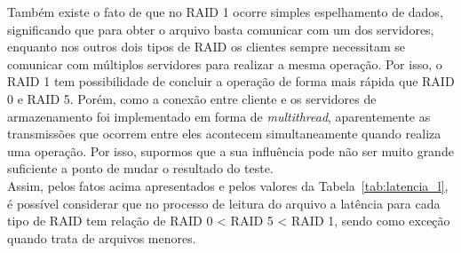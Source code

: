 	Também existe o fato de que no RAID 1 ocorre simples espelhamento de dados, significando que para obter o arquivo basta comunicar com um dos servidores, enquanto nos outros dois tipos de RAID os clientes sempre necessitam se comunicar com múltiplos servidores para realizar a mesma operação. Por isso, o RAID 1 tem possibilidade de concluir a operação de forma mais rápida que RAID 0 e RAID 5. Porém, como a conexão entre cliente e os servidores de armazenamento foi implementado em forma de \textit{multithread}, aparentemente as transmissões que ocorrem entre eles acontecem simultaneamente quando realiza uma operação. Por isso, supormos que a sua influência pode não ser muito grande suficiente a ponto de mudar o resultado do teste.
	\\
	
	Assim, pelos fatos acima apresentados e pelos valores da Tabela~\ref{tab:latencia_l}, é possível considerar que no processo de leitura do arquivo a latência para cada tipo de RAID tem relação de RAID 0 < RAID 5 < RAID 1, sendo como exceção quando trata de arquivos menores.
	\\
	
